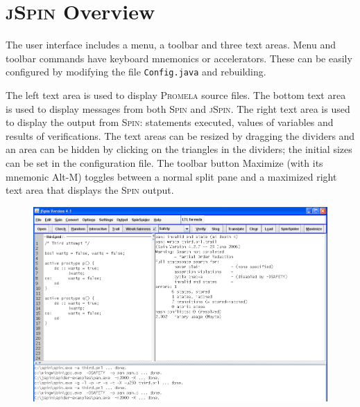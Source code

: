 \documentclass[11pt]{article}
\newcommand{\spn}{\textsc{Spin}}
\newcommand{\prm}{\textsc{Promela}}
\newcommand{\js}{\textsc{jSpin}}
\newcommand{\p}[1]{\texttt{#1}}
\newcommand{\bu}[1]{\textsf{#1}}
\begin{document}
\section{\js{} Overview}
The user interface includes a menu, a toolbar and three text areas.
Menu and toolbar commands have keyboard mnemonics or accelerators.
These can be easily configured by modifying the file \p{Config.java} and
rebuilding.

The left text area is used to display \prm{} source files. The bottom
text area is used to display messages from both \spn{} and \js{}. The
right text area is used to display the output from \spn{}: statements
executed, values of variables and results of verifications. The text
areas can be resized by dragging the dividers and an area can be hidden
by clicking on the triangles in the dividers; the initial sizes can be
set in the configuration file. The toolbar button \bu{Maximize} (with
its mnemonic \bu{Alt-M}) toggles between a normal split pane and a
maximized right text area that displays the \spn{} output.

\begin{figure}[tb]
\begin{center}
\includegraphics[width=140mm]{jspin.png}
\end{center}
\end{figure}
\end{document}

